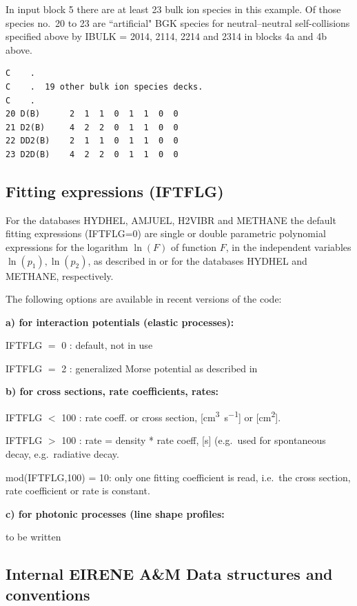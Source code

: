 In input block 5 there are at least 23 bulk ion species in this example.
Of those species no.\ 20 to 23 are ``artificial" \ac{BGK} species for
neutral--neutral self-collisions specified above by IBULK = 2014, 2114, 2214
and 2314 in blocks 4a and 4b above.
\begin{lstlisting}
C    .
C    .  19 other bulk ion species decks.
C    .
20 D(B)      2  1  1  0  1  1  0  0
21 D2(B)     4  2  2  0  1  1  0  0
22 DD2(B)    2  1  1  0  1  1  0  0
23 D2D(B)    4  2  2  0  1  1  0  0
\end{lstlisting}

\subsection{Fitting expressions (IFTFLG)}

For the databases HYDHEL, AMJUEL, H2VIBR and METHANE the default fitting
expressions (IFTFLG=0) are single or double parametric polynomial expressions
for the logarithm $\ln(F)$ of function $F$, in the independent variables
$\ln(p_1), \ln(p_2)$, as described in \cite{kn:Janev} or \cite{kn:Ehrhardt} for
the databases HYDHEL and METHANE, respectively.

The following options are available in recent versions of the code:

\textbf{a) for interaction potentials (elastic processes):}

IFTFLG $=$ 0	:  default, not in use

IFTFLG $=$ 2	:  generalized Morse potential as described in
\cite{kn:Bachmann}

\textbf{b) for cross sections, rate coefficients, rates:}

IFTFLG $<$ 100	:  rate coeff.
or cross section, [\si{\cubic\centi\metre\per\second}] or
  [\si{\square\centi\metre}].

IFTFLG $>$ 100	:  rate = density * rate coeff,  [\si{\second}] (e.g.\ used for
spontaneous decay, e.g.\ radiative decay.

mod(IFTFLG,100) = 10:  only one fitting coefficient is read, i.e.\ the cross
section,
rate coefficient or rate is constant.

\textbf{c) for photonic processes (line shape profiles:}

to be written

\subsection{Internal EIRENE A\&M Data structures and conventions}

